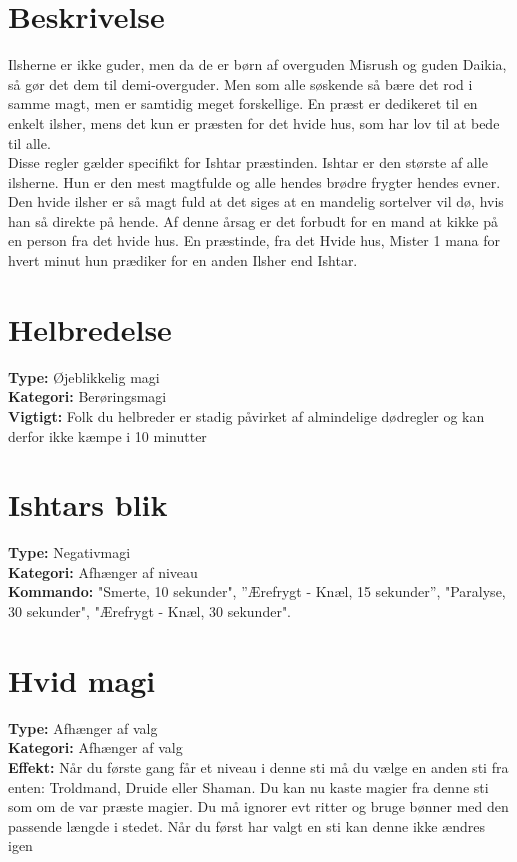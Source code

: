 \section*{Beskrivelse}
Ilsherne er ikke guder, men da de er børn af overguden Misrush og guden Daikia, så gør det dem til demi-overguder. Men som alle søskende så bære det rod i samme magt, men er samtidig meget forskellige. En præst er dedikeret til en enkelt ilsher, mens det kun er præsten for det hvide hus, som har lov til at bede til alle.\\ 
Disse regler gælder specifikt for Ishtar præstinden. Ishtar er den største af alle ilsherne. Hun er den mest magtfulde og alle hendes brødre frygter hendes evner. Den hvide ilsher er så magt fuld at det siges at en mandelig sortelver vil dø, hvis han så direkte på hende. Af denne årsag er det forbudt for en mand at kikke på en person fra det hvide hus. En præstinde, fra det Hvide hus, Mister 1 mana for hvert minut hun prædiker for en anden Ilsher end Ishtar.

\section*{Helbredelse}
\textbf{Type:} Øjeblikkelig magi \\
\textbf{Kategori:} Berøringsmagi\\
\textbf{Vigtigt:} Folk du helbreder er stadig påvirket af almindelige dødregler og kan derfor ikke kæmpe i 10 minutter


\section*{Ishtars blik}
\textbf{Type:} Negativmagi\\
\textbf{Kategori:} Afhænger af niveau\\
\textbf{Kommando:} "Smerte, 10 sekunder", ”Ærefrygt - Knæl, 15 sekunder”, "Paralyse, 30 sekunder", "Ærefrygt - Knæl, 30 sekunder".


\section*{Hvid magi}
\textbf{Type:} Afhænger af valg\\
\textbf{Kategori:} Afhænger af valg \\
\textbf{Effekt:} Når du første gang får et niveau i denne sti må du vælge en anden sti fra enten: Troldmand, Druide eller Shaman. Du kan nu kaste magier fra denne sti som om de var præste magier. Du må ignorer evt ritter og bruge bønner med den passende længde i stedet. Når du først har valgt en sti kan denne ikke ændres igen


